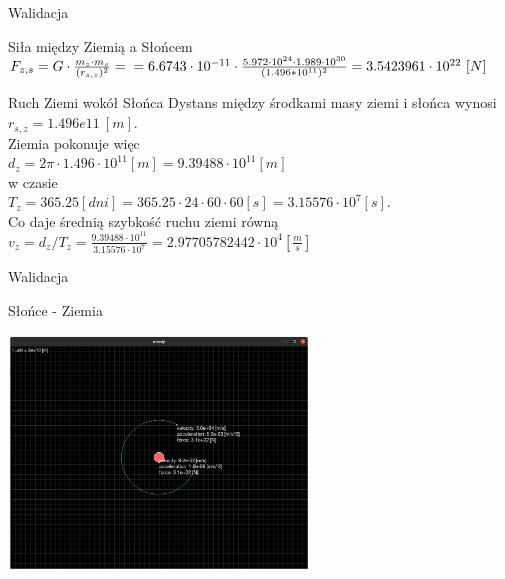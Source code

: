 \documentclass{beamer}
\begin{document}
\begin{frame}{Walidacja}
    \begin{block}{Siła między Ziemią a Słońcem}
        $F_{z,s} = G\cdot \frac{m_{z}\cdot m_{s}}{(r_{s,z})^2} = \\
        = 6.6743\cdot 10^{-11}\cdot 
        \frac{5.972\cdot 10^{24}\cdot 1.989\cdot 10^{30}}
        {(1.496 * 10^{11})^2} = 3.5423961\cdot 10^{22}\ [N]$
    \end{block}
    
    \begin{block}{Ruch Ziemi wokół Słońca}
        Dystans między środkami masy ziemi i słońca wynosi\\ 
        $r_{s,z} = 1.496e11\ [m]$.\\
        Ziemia pokonuje więc\\ 
        $d_z = 2 \pi \cdot 1.496\cdot 10^{11} [m] = 9.39488\cdot 10^{11} [m]$\\
        w czasie\\ 
        $T_z = 365.25 [dni] = 365.25\cdot 24\cdot 60\cdot 60 [s] = 3.15576\cdot 10^{7} [s]$.\\
        Co daje średnią szybkość ruchu ziemi równą\\
        $v_z = d_z / T_z 
        = \frac{9.39488\cdot 10^{11}}{3.15576\cdot 10^{7}} 
        = 2.97705782442\cdot 10^{4} [\frac{m}{s}]$
    \end{block}
\end{frame}

\begin{frame}{Walidacja}
    \begin{block}{Słońce - Ziemia}
        \begin{center}
            \includegraphics[width=8cm]{./img/sun-earth.png}
        \end{center}
    \end{block}
\end{frame}
\end{document}
